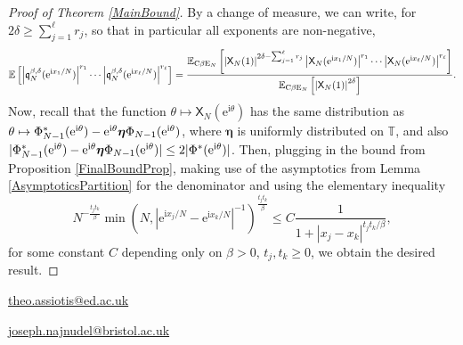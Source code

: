 \documentclass[]{article}
\begin{document}
\begin{proof}[Proof of Theorem \ref{MainBound}]
By a change of measure, we can write, for $2\delta\ge \sum_{j=1}^\ell r_j$, so that in particular all exponents are non-negative,
\begin{align*}
\mathbb{E}\left[\left|\mathfrak{q}_N^{\beta,\delta}(\mathrm{e}^{\mathrm{i}x_1/N})\right|^{r_1}\cdots \left|\mathfrak{q}_N^{\beta,\delta}(\mathrm{e}^{\mathrm{i}x_\ell/N})\right|^{r_\ell}\right]=\frac{\mathbb{E}_{\textnormal{C}\beta \textnormal{E}_N}\left[\left|\mathsf{X}_N(1)\right|^{2\delta-\sum_{j=1}^\ell r_j} \left|\mathsf{X}_N(\mathrm{e}^{\mathrm{i}x_1/N})\right|^{r_1}\cdots \left|\mathsf{X}_N(\mathrm{e}^{\mathrm{i}x_\ell/N})\right|^{r_\ell}\right]}{\mathbb{E}_{\textnormal{C}\beta \textnormal{E}_N}\left[\left|\mathsf{X}_N(1)\right|^{2\delta}\right]}.
\end{align*}
Now, recall that the function $\theta \mapsto \mathsf{X}_N(\mathrm{e}^{\mathrm{i}\theta})$ has the same distribution as $\theta \mapsto \Phi^*_{N-1} (\mathrm{e}^{\textnormal{i}\theta })- \mathrm{e}^{\textnormal{i}\theta } \boldsymbol{\eta} \Phi_{N-1} (\mathrm{e}^{\textnormal{i}\theta })$, where $\boldsymbol{\eta}$ is uniformly distributed on $\mathbb{T}$, and also $| \Phi^*_{N-1} (\mathrm{e}^{\textnormal{i}\theta })- \mathrm{e}^{\textnormal{i}\theta } \boldsymbol{\eta} \Phi_{N-1} (\mathrm{e}^{\textnormal{i}\theta })| \le 2 |\Phi^*(\mathrm{e}^{\mathrm{i}\theta})|$.
Then, plugging in the bound from Proposition \ref{FinalBoundProp}, making use of the asymptotics from Lemma \ref{AsymptoticsPartition} for the denominator and using the elementary inequality
\begin{equation*}
N^{-\frac{t_jt_k}{\beta}}\min\left(N,\left|\mathrm{e}^{\mathrm{i}x_j/N}-\mathrm{e}^{\mathrm{i}x_k/N}\right|^{-1}\right)^{\frac{t_jt_k}{\beta}} \le C \frac{1}{1+\left|x_j-x_k\right|^{t_jt_k/\beta}},
\end{equation*}
for some constant $C$ depending only on 
$\beta > 0$, $t_j, t_k \geq 0$, 
we obtain the desired result.
\end{proof}



 



\bigskip 

\newline
\href{mailto:theo.assiotis@ed.ac.uk}{\small theo.assiotis@ed.ac.uk}

\bigskip

\newline
\href{mailto:joseph.najnudel@bristol.ac.uk}{\small joseph.najnudel@bristol.ac.uk}
\end{document}
